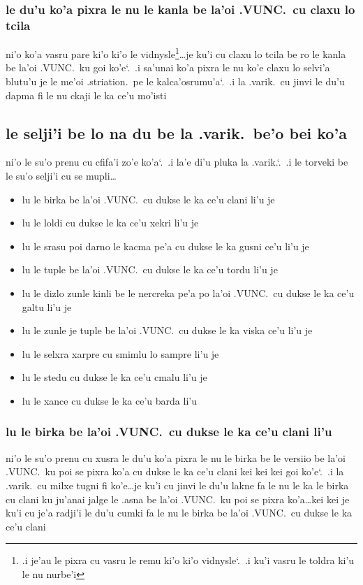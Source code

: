 \documentclass{report}
\newcommand\sds{\spacefactor\sfcode`.\ \space}
\begin{document}
\subsubsection{le du'u ko'a pixra le nu le kanla be la'oi .VUNC.\ cu claxu lo tcila}
ni'o ko'a vasru pare ki'o ki'o le vidnysle\footnote{.i je'au le pixra cu vasru le remu ki'o ki'o vidnysle\sds  .i ku'i vasru le toldra ki'u le nu nurbe'i}\ldots je ku'i cu claxu lo tcila be ro le kanla be la'oi .VUNC.\ ku goi ko'e\sds  .i sa'unai ko'a pixra le nu ko'e claxu lo selvi'a blutu'u je le me'oi .striation.\ pe le kalca'osrumu'a\sds  .i la .varik.\ cu jinvi le du'u dapma fi le nu ckaji le ka ce'u mo'isti

\subsection{le selji'i be lo na du be la .varik.\ be'o bei ko'a}
ni'o le su'o prenu cu cfifa'i zo'e ko'a\sds  .i la'e di'u pluka la .varik.\sds  .i le torveki be le su'o selji'i cu se mupli\ldots
\begin{itemize}
	\item lu le birka be la'oi .VUNC.\ cu dukse le ka ce'u clani li'u je
	\item lu le loldi cu dukse le ka ce'u xekri li'u je
	\item lu le srasu poi darno le kacma pe'a cu dukse le ka gusni ce'u li'u je
	\item lu le tuple be la'oi .VUNC.\ cu dukse le ka ce'u tordu li'u je
	\item lu le dizlo zunle kinli be le nercreka pe'a po la'oi .VUNC.\ cu dukse le ka ce'u galtu li'u je
	\item lu le zunle je tuple be la'oi .VUNC.\ cu dukse le ka viska ce'u li'u je
	\item lu le selxra xarpre cu smimlu lo sampre li'u je
	\item lu le stedu cu dukse le ka ce'u cmalu li'u je
	\item lu le xance cu dukse le ka ce'u barda li'u
\end{itemize}

\subsubsection{lu le birka be la'oi .VUNC.\ cu dukse le ka ce'u clani li'u}
ni'o le su'o prenu cu xusra le du'u ko'a pixra le nu le birka be le versiio be la'oi .VUNC.\ ku poi se pixra ko'a cu dukse le ka ce'u clani kei kei kei goi ko'e\sds  .i la .varik.\ cu milxe tugni fi ko'e\ldots je ku'i cu jinvi le du'u lakne fa le nu le ka le birka cu clani ku ju'anai jalge le .asna be la'oi .VUNC.\ ku poi se pixra ko'a\ldots kei kei je ku'i cu je'a radji'i le du'u cumki fa le nu le birka be la'oi .VUNC.\ cu dukse le ka ce'u clani
\end{document}
